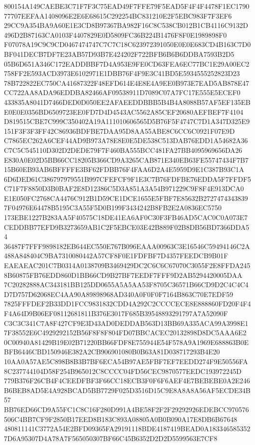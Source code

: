 \documentclass[UTF8,fontset=fandol,zihao=-4,a4paper]{ctexart}
\begin{document}
{{800154A149CAEBE3C71F7F3C75EAD49F7FFE79F5EAD5F4F4F4478F1EC179077707EEFAA1408096E2E6E68615C292254BC831210E2F5EBC983F7F3EF6
29CC9A354BA9A60E1E3CD8B97367BA982F16C8C538CB012B1CB4116C9132D496D2B87163CA0103F4407829E0D5809FC36B224B1476F8F0E1989898F0
F07078A19C9C9CD0467474747C7C7C18C623972391050E0E0E683CD4B163C7D0BF041DECB7DF7E23AB57D93B7E424202F722BFB6B6B6DDBA7593B2D5
05B6D651A346C172EADDBBF7D4A953E9FE0CD63FEA6EC77BC1E29A00EC2758FF2E593ACD3973E6102971E1DBB76F4F9E3C41BD5E5934555252823D23
78B722822EC750CA41687322F48EFD614E4E8E4A9EE0B973E7EAD5AB878E47CC722AA8ADA96EDDBA82466AF09538911D7089C07A7FC17E555E5ECEF0
433835A8041D7466DED0D050EE2AFAEEDDBBB5B4B4A8088B57AF5EF135EBE0E0E0356BD6509723EE0FD7D4D4543AC5562A85CEF20680AEFBEF7F4104
D819515CBE7C999C350402A19A111010606565D5B76F5F4747C7D1A347D325E9151F3F3F3FF42C86936BDFBE7DAA95D8AA55ABE8C6CC6C0921F07E9D
C7865EC262A6CEF44AD9B973A78E8E0E5DE538C513DAB76EDD1A54682A36C7C5C545110D302D2DEDE79F7F460BA555BCC481FA27BB4095969656DA26
E830A0E02D5BB66CC18205B366CD9A3265CAB871E340EB63FE55747434F7B715B60EB93AB6BFFFFE3BF62FDBB76F4FAA6D2A4E5959D9E1C387B93C1A
6D6DED61C386797979551B997CFEFCF9F1E3C7B76FDFBE76EDDA5F7FFDF5C71F7F8850D3B0BAF2E8D12386C5D3A851A3A54B971229C9F8F4E913DCA0
E1E050FC2768CA4476C912B1D59CE1DCE1655E5FBF7E85632B27274743438397F04976E64478B5195C3A55F5D0B199F3434242B8FB2E2A0836EC5750
173EBE1227B283AA5F40575C18DE41EA6AF0C30F3FB46AD5CAC0C0A073E7CEDDBB77EFD9B3273659AB1C2F5EBCE03E42B889F02B8DB56BD7366DDA54
36487F7FFF9898182EB644EC550E767B096EAAA00963C3E16546C59494146C2A488A848404C9BA7310080442A57CF8F0E1FDFBF7D4357FEEDCB9B01F
EAEAEAC201C7B0314A0138709B3469429DC2C6C6C67070C3055F2E8FFDA2458B60875FB76EDD860D1BB66CD9B27BF7EEDF7FFF9D2AB5294420005DAA
7C20282888AC343181BB125DD0655A5A5AA53F8705C36571B66CD9D2C4C4C4D7D757D62068EC4AA90A89898968AD340A0F0F0F7164B863C70E7EDF59
7825FFFDEF2B33DD1FCC9831832CDD4A292C2CCCCECE8E888860FD20F4F4F4A64D9B06EF08112681811B376E3017F685B39548893291797A7A52090F
C3C3C341C7A8F427CF9E3D43AD0DEDDAB563D13BB69A335ACA99A3998E17F38552E6C4929292152B56F8F8F804FD07BBCACEC20132898D8DC5AAA6E2
0C00940A81429B19E02B71220BB66FDF8E755944E54F578A9A1969E688863B0EBFB6446CBD150946E382A2CB906901080B0B63A81D038717293B4E20
10AA0A57AE5C898B8B3B7BF6ECA54B97AE5FBF7EF7EEDD274F9E50556FA8C237744104D58F254B965012C8CCCC04FD56CEC9870577EEDC193972245D
779B376F26CB4F4CEEDFBF3F66CC18ECB3F0F6F6AEF4E7BEBEBE0A2E246B6BEB8AD5E4A928BCAD5BB7729F025D3516D15C9E8A8A8A56AF5ECDE34B57
BB76ED66CD9A55FC1C8C16F280D991A4BE58F2F2F29292926EDEBCC970576506C4BB7CF9F2850B17EED8B183C893A08805A0B0B090A17E8DB6B67648
480811141C3772A54E2BFD09365FA29191118BDE4187419BEAD0A1833465853527D6A95307D4A78A7F565050307BF66C45B6352D2D2D5599563E7CF8
}}
\end{document}
